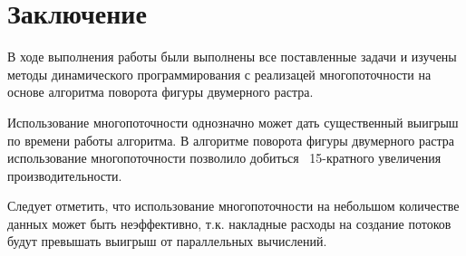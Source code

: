 \chapter*{Заключение}

В ходе выполнения работы были выполнены все поставленные задачи и изучены методы динамического программирования с реализацей многопоточности на основе алгоритма поворота фигуры двумерного растра.

Использование многопоточности однозначно может дать существенный выигрыш по времени работы алгоритма. В алгоритме поворота фигуры двумерного растра использование многопоточности позволило добиться ~15-кратного увеличения производительности.

Следует отметить, что использование многопоточности на небольшом количестве данных может быть неэффективно, т.к. накладные расходы на создание потоков будут превышать выигрыш от параллельных вычислений.

